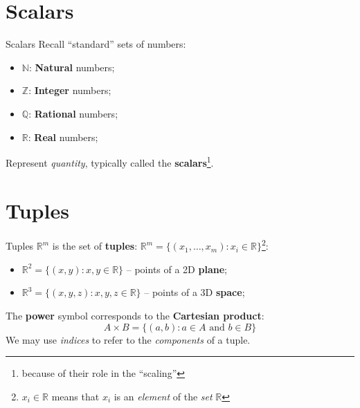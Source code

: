 \documentclass[10pt]{beamer}
\begin{document}
\section{Scalars}
\begin{frame}{Scalars}
    Recall ``standard'' sets of numbers:

    \begin{itemize}
        \item $\mathbb N$: \textbf{Natural} numbers;
        \item $\mathbb Z$: \textbf{Integer} numbers;
        \item $\mathbb Q$: \textbf{Rational} numbers;
        \item $\mathbb R$: \textbf{Real} numbers;
    \end{itemize}

    Represent \textit{quantity}, typically called the \textbf{scalars}\footnote{because of their role in the ``scaling''}.
\end{frame}

\section{Tuples}
\begin{frame}{Tuples}
    $\mathbb R^m$ is the set of \textbf{tuples}: $\mathbb R^m = \{(x_1,\dots,x_m) : x_i \in \mathbb R\}$\footnote{$x_i \in \mathbb R$ means that $x_i$ is an \textit{element} of the \textit{set} $\mathbb R$}:

    \begin{itemize}
        \item $\mathbb R^2 = \{(x, y) : x, y \in \mathbb R\}$ -- points of a 2D \textbf{plane};
        \item $\mathbb R^3 = \{(x, y, z): x, y, z \in \mathbb R\}$ -- points of a 3D \textbf{space};
    \end{itemize}

    The \textbf{power} symbol corresponds to the \textbf{Cartesian product}:
    $$
    A \times B = \{(a, b) : a \in A \text{ and } b \in B\}
    $$
    We may use \textit{indices} to refer to the \textit{components} of a tuple.
\end{frame}
\end{document}
